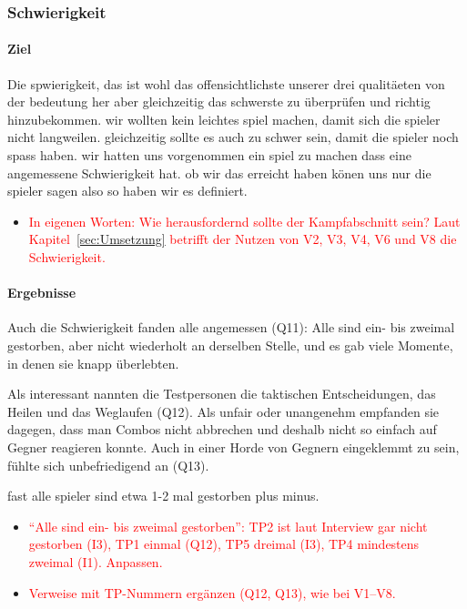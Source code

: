 \documentclass[../Main.tex]{subfiles}
\begin{document}
\subsubsection{Schwierigkeit}

\paragraph{Ziel}
Die spwierigkeit, das ist wohl das offensichtlichste unserer drei qualitäeten von der bedeutung her aber gleichzeitig das schwerste zu überprüfen und richtig hinzubekommen. wir wollten kein leichtes spiel machen, damit sich die spieler nicht langweilen. gleichzeitig sollte es auch zu schwer sein, damit die spieler noch spass haben. wir hatten uns vorgenommen ein spiel zu machen dass eine angemessene Schwierigkeit hat. ob wir das erreicht haben könen uns nur die spieler sagen also so haben wir es definiert.

\begin{itemize}[leftmargin=1.5cm]
    \item \textcolor{red}{In eigenen Worten: Wie herausfordernd sollte der Kampfabschnitt sein? Laut Kapitel~\ref{sec:Umsetzung} betrifft der Nutzen von V2, V3, V4, V6 und V8 die Schwierigkeit.}
\end{itemize}

\paragraph{Ergebnisse}
Auch die Schwierigkeit fanden alle angemessen (Q11): Alle sind ein- bis zweimal gestorben, aber nicht wiederholt an derselben Stelle, und es gab viele Momente, in denen sie knapp überlebten.

Als interessant nannten die Testpersonen die taktischen Entscheidungen, das Heilen und das Weglaufen (Q12). Als unfair oder unangenehm empfanden sie dagegen, dass man Combos nicht abbrechen und deshalb nicht so einfach auf Gegner reagieren konnte. Auch in einer Horde von Gegnern eingeklemmt zu sein, fühlte sich unbefriedigend an (Q13).

fast alle spieler sind etwa 1-2 mal gestorben plus minus.

\begin{itemize}[leftmargin=1.5cm]
    \item \textcolor{red}{\enquote{Alle sind ein- bis zweimal gestorben}: TP2 ist laut Interview gar nicht gestorben (I3), TP1 einmal (Q12), TP5 dreimal (I3), TP4 mindestens zweimal (I1). Anpassen.}
    \item \textcolor{red}{Verweise mit TP-Nummern ergänzen (Q12, Q13), wie bei V1--V8.}
\end{itemize}
\end{document}
